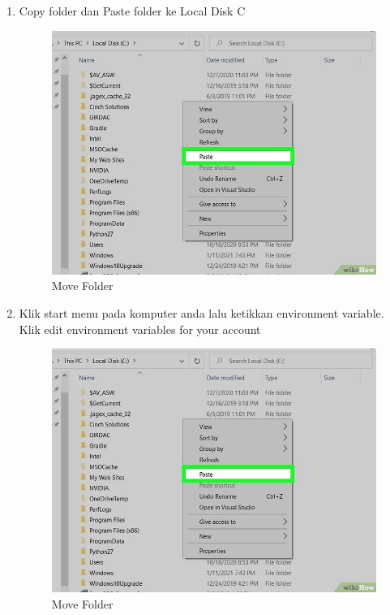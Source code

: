\begin{enumerate}
\item Copy folder dan Paste folder ke Local Disk C
\begin{figure}[H]
\centering
\includegraphics[scale=1.5]{figures/python10}
\caption{Move Folder}
\label{python10}
\end{figure}

\item Klik start menu pada komputer anda lalu ketikkan environment variable. Klik edit environment variables for your account
\begin{figure}[H]
\centering
\includegraphics[scale=1.5]{figures/python10}
\caption{Move Folder}
\label{python10}
\end{figure}


\end{enumerate}
